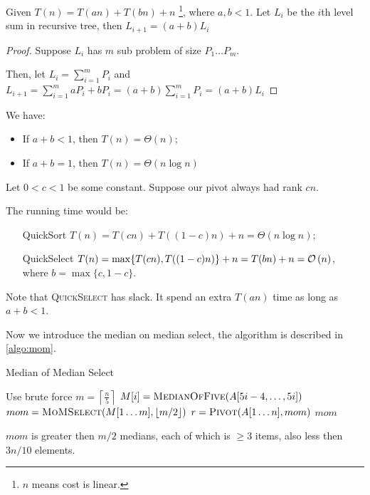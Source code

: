 \Claim Given $T(n) = T(an) + T(bn) + n$
\footnote{$n$ means cost is linear.},
where $a,b<1$. Let $L_i$ be the $i$th level sum
in recursive tree, then $L_{i+1} = (a + b)L_i$

\begin{proof}
Suppose $L_i$ has $m$ sub problem of size $P_1 \ldots P_m$.

Then, let $\displaystyle L_i = \sum_{i=1}^m{P_i}$
and $\displaystyle L_{i+1} = \sum_{i=1}^m{aP_i+bP_i} = (a+b)\sum_{i=1}^m{P_i}=(a+b)L_i$
\end{proof}

We have:
\begin{itemize}
    \item If $a+b <1$, then $T(n) = \Theta(n)$;
    \item If $a+b =1$, then $T(n) = \Theta(n \log n)$
\end{itemize}

Let $0<c<1$ be some constant. Suppose our pivot always had rank $cn$.

The running time would be:
\begin{itemize}[leftmargin=1.2in]
    \item[QuickSort] $T(n) = T(cn) + T((1-c)n) + n = \Theta(n \log n)$;
    \item[QuickSelect] $T(n) = \max\{T(cn), T((1-c)n)\} + n = T(bn) + n = \mathcal{O}\left(n\right)$,\\
        where $b = \max\{c, 1-c\}$.
\end{itemize}

Note that \textsc{QuickSelect} has slack. It spend an extra $T(an)$ time as long as $a+b<1$.

Now we introduce the median on median select, the algorithm is described in \cref{algo:mom}.

\begin{algorithm}[H]
    \caption{Median of Median Select}\label{algo:mom}
    \begin{algorithmic}[1]
                \State Use brute force
            \Else
                \State $\displaystyle m = \left\lceil\frac{n}{5}\right\rceil$
                    \State $M[i] = \textsc{MedianOfFive} (A[5i-4, \ldots ,5i])$
                \EndFor
                \State $mom = \textsc{MoMSelect} (M[1 \ldots m], \lfloor m/2 \rfloor)$
                \State $r = \textsc{Pivot} (A[1 \ldots n], mom)$
                    \Return {}
                    \Return {}
                \Else
                    \Return $mom$
                \EndIf
            \EndIf
        \EndProcedure
    \end{algorithmic}
\end{algorithm}

\observation
$mom$ is greater then $m/2$ medians, each of which is $\geq 3$ items, also less then $3n/10$ elements.
